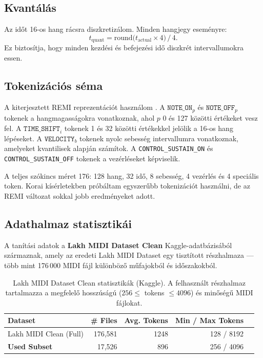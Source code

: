 \subsection{Kvantálás}
Az időt 16-os hang rácsra diszkretizálom. Minden hangjegy eseményre:
\[
  t_{\text{quant}} = \mathrm{round}\!\bigl(t_{\text{actual}} \times 4 \bigr) \,/\,4.
\]
Ez biztosítja, hogy minden kezdési és befejezési idő diszkrét intervallumokra essen.

\subsection{Tokenizációs séma}
A kiterjesztett REMI reprezentációt használom \cite{huang2020pop}. A $\texttt{NOTE\_ON}_p$ és $\texttt{NOTE\_OFF}_p$ tokenek a hangmagasságokra vonatkoznak, ahol $p$ 0 és 127 közötti értékeket vesz fel. A $\texttt{TIME\_SHIFT}_i$ tokenek 1 és 32 közötti értékekkel jelölik a 16-os hang lépéseket. A $\texttt{VELOCITY}_b$ tokenek nyolc sebesség intervallumra vonatkoznak, amelyeket kvantilisek alapján számítok. A \texttt{CONTROL\_SUSTAIN\_ON} és \texttt{CONTROL\_SUSTAIN\_OFF} tokenek a vezérléseket képviselik.

A teljes szókincs méret 176: 128 hang, 32 idő, 8 sebesség, 4 vezérlés és 4 speciális token. Korai kísérletekben próbáltam egyszerűbb tokenizációt használni, de az REMI változat sokkal jobb eredményeket adott.

\subsection{Adathalmaz statisztikái}

A tanítási adatok a \textbf{Lakh MIDI Dataset Clean} Kaggle-adatbázisából származnak, amely az eredeti Lakh MIDI Dataset \cite{raffel2016learning} egy tisztított részhalmaza --- több mint 176\,000 MIDI fájl különböző műfajokból és időszakokból.

\begin{table}[ht]
  \centering
  \begin{tabular}{lrrrr}
    \toprule
    \textbf{Dataset} & \# Files & Avg. Tokens & Min / Max Tokens \\
    \midrule
    Lakh MIDI Clean (Full) & 176,581 & 1248 & 128 / 8192 \\
    \midrule
    \textbf{Used Subset} & 17,526 & 896 & 256 / 4096 \\
    \bottomrule
  \end{tabular}
  \caption{Lakh MIDI Dataset Clean statisztikák (Kaggle). A felhasznált részhalmaz tartalmazza a megfelelő hosszúságú ($256 \le$ tokens $\le 4096$) és minőségű MIDI fájlokat.}
\end{table}

